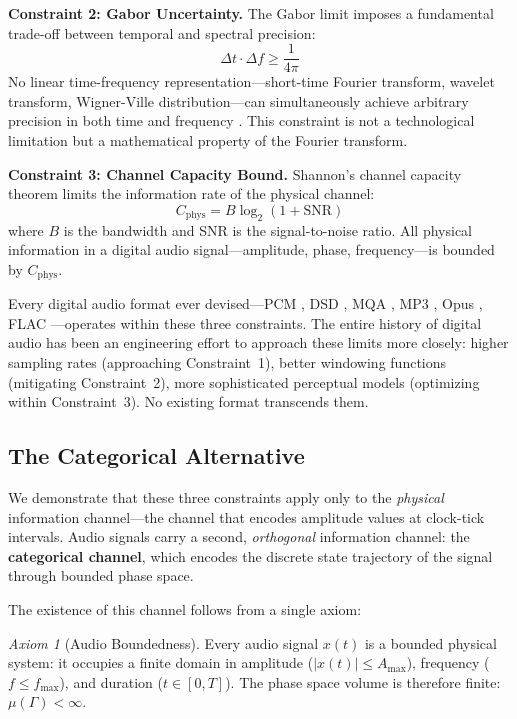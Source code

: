 \documentclass[twocolumn,10pt]{article}
\theoremstyle{remark}
\newtheorem{axiom}[theorem]{Axiom}
\newcommand{\Cphys}{C_{\mathrm{phys}}}
\begin{document}
\textbf{Constraint 2: Gabor Uncertainty.} The Gabor limit \cite{gabor1946} imposes a fundamental trade-off between temporal and spectral precision:
\begin{equation}
    \Delta t \cdot \Delta f \geq \frac{1}{4\pi}
    \label{eq:gabor_limit}
\end{equation}
No linear time-frequency representation---short-time Fourier transform, wavelet transform, Wigner-Ville distribution---can simultaneously achieve arbitrary precision in both time and frequency \cite{flandrin1999, cohen1995}. This constraint is not a technological limitation but a mathematical property of the Fourier transform.

\textbf{Constraint 3: Channel Capacity Bound.} Shannon's channel capacity theorem \cite{shannon1948} limits the information rate of the physical channel:
\begin{equation}
    \Cphys = B \log_2(1 + \mathrm{SNR})
    \label{eq:shannon_capacity}
\end{equation}
where $B$ is the bandwidth and SNR is the signal-to-noise ratio. All physical information in a digital audio signal---amplitude, phase, frequency---is bounded by $\Cphys$.

Every digital audio format ever devised---PCM \cite{pohlmann2010}, DSD \cite{sony1999dsd}, MQA \cite{stuart2014mqa}, MP3 \cite{brandenburg1994}, Opus \cite{valin2012}, FLAC \cite{flac2001}---operates within these three constraints. The entire history of digital audio has been an engineering effort to approach these limits more closely: higher sampling rates (approaching Constraint~1), better windowing functions (mitigating Constraint~2), more sophisticated perceptual models (optimizing within Constraint~3). No existing format transcends them.

\subsection{The Categorical Alternative}

We demonstrate that these three constraints apply only to the \textit{physical} information channel---the channel that encodes amplitude values at clock-tick intervals. Audio signals carry a second, \textit{orthogonal} information channel: the \textbf{categorical channel}, which encodes the discrete state trajectory of the signal through bounded phase space.

The existence of this channel follows from a single axiom:

\begin{axiom}[Audio Boundedness]
\label{ax:boundedness}
Every audio signal $x(t)$ is a bounded physical system: it occupies a finite domain in amplitude ($|x(t)| \leq A_{\max}$), frequency ($f \leq f_{\max}$), and duration ($t \in [0, T]$). The phase space volume is therefore finite: $\mu(\Gamma) < \infty$.
\end{axiom}
\end{document}
